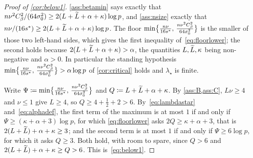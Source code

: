 \begin{proof}[Proof of \cref{cor:below1}]
    \cref{ass:betamin} says exactly that
    $n\nu^{2}C_\beta^{2}/(64\sigma_0^{2})\geq
    2(L+\widetilde{L}+\alpha+\kappa)\log p$, and \cref{ass:nsize} exactly that
    $n\nu/(16s^{\ast})\geq2(L+\widetilde{L}+\alpha+\kappa)\log p$. The floor
    $\min\bigl\{\tfrac{n\nu}{16s^{\ast}},\, \tfrac{n\nu^{2}C_\beta^{2}}{64\sigma_0^{2}}\bigr\}$ is the smaller of those two left-hand sides, which gives
    the first inequality of~\eqref{eq:floorlower}; the second holds because
    $2(L+\widetilde{L}+\alpha+\kappa)>\alpha$, the quantities $L,\widetilde{L},\kappa$ being
    non-negative and $\alpha>0$. In particular
    the standing hypothesis $\min\bigl\{\tfrac{n\nu}{16s^{\ast}},\, \tfrac{n\nu^{2}C_\beta^{2}}{64\sigma_0^{2}}\bigr\}>\alpha\log p$ of
    \cref{cor:critical} holds and $\lambda_\star$ is finite.

    Write $\Psi\coloneq\min\bigl\{\tfrac{n\nu}{16s^{\ast}},\, \tfrac{n\nu^{2}C_\beta^{2}}{64\sigma_0^{2}}\bigr\}$ and $Q\coloneq L+\widetilde{L}+\alpha+\kappa$.
    By \cref{ass:B,ass:C}, $L\nu\geq4$ and $\nu\leq1$ give $L\geq4$, so
    $Q\geq4+\tfrac12+2>6$. By~\eqref{eq:lambdastar}
    and~\eqref{eq:alphadef}, the first term of the maximum is at most $1$ if
    and only if $\Psi\geq(\kappa+\alpha+3)\log p$, for which
    \eqref{eq:floorlower} asks $2Q\geq\kappa+\alpha+3$, that is
    $2(L+\widetilde{L})+\alpha+\kappa\geq3$; and the second term is at most $1$ if
    and only if $\Psi\geq6\log p$, for which it asks $Q\geq3$. Both hold,
    with room to spare, since $Q>6$ and $2(L+\widetilde{L})+\alpha+\kappa\geq
    Q>6$. This is~\eqref{eq:below1}.
\end{proof}

